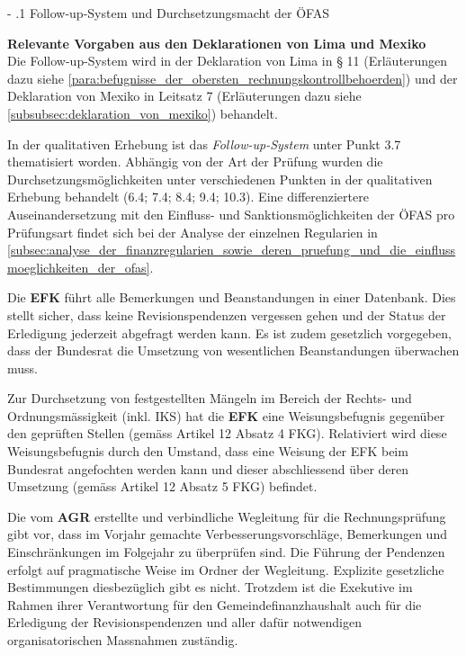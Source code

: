 \documentclass[10pt]{article}
\makeatletter
\renewcommand\subparagraph{\@startsection{subparagraph}{4}{0mm}{-\baselineskip}{.1\baselineskip}{\normalfont\normalsize\bfseries}}
\renewcommand\subparagraph{%
\@startsection{subparagraph}{4}{0mm}%
{-\baselineskip}%
{.1\baselineskip}%
{\normalfont\normalsize\bfseries}}
\makeatother
\begin{document}
\subparagraph{Follow-up-System und Durchsetzungsmacht der ÖFAS}\label{subpara:follow_up_system_und_durchsetzungsmacht_der_ofas}
\begin{shaded}
\textbf{Relevante Vorgaben aus den Deklarationen von Lima und Mexiko}\\
Die Follow-up-System wird in der Deklaration von Lima in § 11 (Erläuterungen dazu siehe \vref{para:befugnisse_der_obersten_rechnungskontrollbehoerden}) und der Deklaration von Mexiko in Leitsatz 7 (Erläuterungen dazu siehe \vref{subsubsec:deklaration_von_mexiko}) behandelt.

\end{shaded}
In der qualitativen Erhebung ist das \textit{Follow-up-System} unter Punkt 3.7 thematisiert worden. Abhängig von der Art der Prüfung wurden die Durchsetzungsmöglichkeiten unter verschiedenen Punkten in der qualitativen Erhebung behandelt (6.4; 7.4; 8.4; 9.4; 10.3). Eine differenziertere Auseinandersetzung mit den Einfluss- und Sanktionsmöglichkeiten der ÖFAS pro Prüfungsart findet sich bei der Analyse der einzelnen Regularien in \vref{subsec:analyse_der_finanzregularien_sowie_deren_pruefung_und_die_einflussmoeglichkeiten_der_ofas}.

Die \textbf{EFK} führt alle Bemerkungen und Beanstandungen in einer Datenbank. Dies stellt sicher, dass keine Revisionspendenzen vergessen gehen und der Status der Erledigung jederzeit abgefragt werden kann. Es ist zudem gesetzlich vorgegeben, dass der Bundesrat die Umsetzung von wesentlichen Beanstandungen überwachen muss.

Zur Durchsetzung von festgestellten Mängeln im Bereich der Rechts- und Ordnungsmässigkeit (inkl. IKS) hat die \textbf{EFK} eine Weisungsbefugnis gegenüber den geprüften Stellen (gemäss Artikel 12 Absatz 4 FKG). Relativiert wird diese Weisungsbefugnis durch den Umstand, dass eine Weisung der EFK beim Bundesrat angefochten werden kann und dieser abschliessend über deren Umsetzung (gemäss Artikel 12 Absatz 5 FKG) befindet.

Die vom \textbf{AGR} erstellte und verbindliche Wegleitung für die Rechnungsprüfung gibt vor, dass im Vorjahr gemachte Verbesserungsvorschläge, Bemerkungen und Einschränkungen im Folgejahr zu überprüfen sind. Die Führung der Pendenzen erfolgt auf pragmatische Weise im Ordner der Wegleitung. Explizite gesetzliche Bestimmungen diesbezüglich gibt es nicht. Trotzdem ist die Exekutive im Rahmen ihrer Verantwortung für den Gemeindefinanzhaushalt auch für die Erledigung der Revisionspendenzen und aller dafür notwendigen organisatorischen Massnahmen zuständig.
\end{document}
